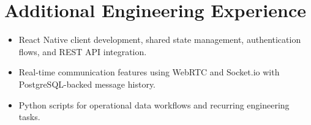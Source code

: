 \documentclass[11pt,a4paper,sans]{moderncv}
\begin{document}

\section{Additional Engineering Experience}
\vspace{1pt}
\begin{itemize}
\item {React Native client development, shared state management, authentication flows, and REST API integration.}
\item {Real-time communication features using WebRTC and Socket.io with PostgreSQL-backed message history.}
\item {Python scripts for operational data workflows and recurring engineering tasks.}
\end{itemize}


\end{document}
